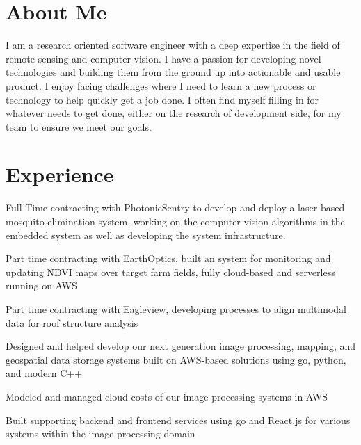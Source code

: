 \documentclass[]{nilosek-resume}
\begin{document}
\begin{minipage}[t]{0.7\textwidth} 


\section{About Me}
I am a research oriented software engineer with a deep expertise in the field of remote sensing and computer vision. I have a passion for developing novel technologies and building them from the ground up into actionable and usable product. I enjoy facing challenges where I need to learn a new process or technology to help quickly get a job done. I often find myself filling in for whatever needs to get done, either on the research of development side, for my team to ensure we meet our goals.


\section{Experience}
\vspace{\topsep} %
\begin{tightemize}
	\item Full Time contracting with PhotonicSentry to develop and deploy a laser-based mosquito elimination system, working on the computer vision algorithms in the embedded system as well as developing the system infrastructure.
	\item Part time contracting with EarthOptics, built an system for monitoring and updating NDVI maps over target farm fields, fully cloud-based and serverless running on AWS
	\item Part time contracting with Eagleview, developing processes to align multimodal data for roof structure analysis
\end{tightemize}
\sectionsep

\vspace{\topsep} %
\begin{tightemize}
	\item Designed and helped develop our next generation image processing, mapping, and geospatial data storage systems built on AWS-based solutions using go, python, and modern C++
	\item Modeled and managed cloud costs of our image processing systems in AWS
	\item Built supporting backend and frontend services using go and React.js for various systems within the image processing domain
\end{tightemize}
\sectionsep


\end{minipage}
\end{document}
